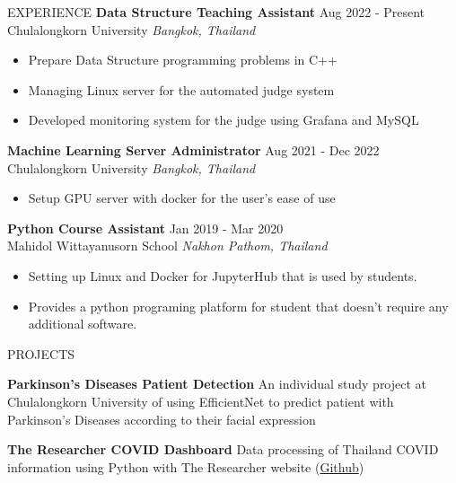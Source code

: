 \documentclass{resume} %
\begin{document}
\begin{rSection}{EXPERIENCE}
    \textbf{Data Structure Teaching Assistant} \hfill Aug 2022 - Present\\
    Chulalongkorn University \hfill \textit{Bangkok, Thailand}
    \begin{itemize}
        \itemsep -3pt {}
        \item Prepare Data Structure programming problems in C++
        \item Managing Linux server for the automated judge system
        \item Developed monitoring system for the judge using Grafana and MySQL
    \end{itemize}
    \textbf{Machine Learning Server Administrator} \hfill Aug 2021 - Dec 2022\\
    Chulalongkorn University \hfill \textit{Bangkok, Thailand}
    \begin{itemize}
        \itemsep -3pt {}
        \item Setup GPU server with docker for the user's ease of use
    \end{itemize}
    \textbf{Python Course Assistant} \hfill Jan 2019 - Mar 2020\\
    Mahidol Wittayanusorn School \hfill \textit{Nakhon Pathom, Thailand}
    \begin{itemize}
        \itemsep -3pt {}
        \item Setting up Linux and Docker for JupyterHub that is used by students.
        \item Provides a python programing platform for student that doesn't require any additional software.
    \end{itemize}

\end{rSection}


\begin{rSection}{PROJECTS}
    \vspace{-1.25em}
    \item \textbf{Parkinson's Diseases Patient Detection} {An individual study project at Chulalongkorn University of using EfficientNet to predict patient with Parkinson's Diseases according to their facial expression}
    \item \textbf{The Researcher COVID Dashboard} {Data processing of Thailand COVID information using Python with The Researcher website} (\href{https://github.com/porames/the-researcher-covid-data}{Github})
\end{rSection}
\end{document}
